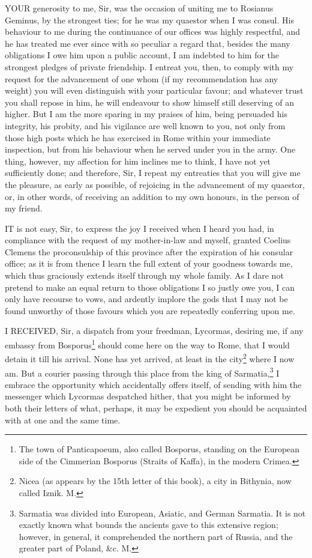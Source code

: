 YOUR generosity to me, Sir, was the occasion of uniting me to Rosianus
Geminus, by the strongest ties; for he was my quaestor when I was consul.
His behaviour to me during the continuance of our offices was highly
respectful, and he has treated me ever since with so peculiar a regard
that, besides the many obligations I owe him upon a public account, I am
indebted to him for the strongest pledges of private friendship. I entreat
you, then, to comply with my request for the advancement of one whom (if
my recommendation has any weight) you will even distinguish with your
particular favour; and whatever trust you shall repose in him, he will
endeavour to show himself still deserving of an higher. But I am the more
sparing in my praises of him, being persuaded his integrity, his probity,
and his vigilance are well known to you, not only from those high posts
which he has exercised in Rome within your immediate inspection, but from
his behaviour when he served under you in the army. One thing, however, my
affection for him inclines me to think, I have not yet sufficiently done;
and therefore, Sir, I repeat my entreaties that you will give me the
pleasure, as early as possible, of rejoicing in the advancement of my
quaestor, or, in other words, of receiving an addition to my own honours,
in the person of my friend.


IT is not easy, Sir, to express the joy I received when I heard you had,
in compliance with the request of my mother-in-law and myself, granted
Coelius Clemens the proconsulship of this province after the expiration of
his consular office; as it is from thence I learn the full extent of your
goodness towards me, which thus graciously extends itself through my whole
family. As I dare not pretend to make an equal return to those obligations
I so justly owe you, I can only have recourse to vows, and ardently
implore the gods that I may not be found unworthy of those favours which
you are repeatedly conferring upon me.


I RECEIVED, Sir, a dispatch from your freedman, Lycormas, desiring me, if
any embassy from Bosporus\footnote{The town of
Panticapoeum, also called Bosporus, standing on the European side of the
Cimmerian Bosporus (Straits of Kaffa), in the modern Crimea.} should come here on the way to Rome, that
I would detain it till his arrival. None has yet arrived, at least in the
city\footnote{Nicea (as appears by
the 15th letter of this book), a city in Bithynia, now called Iznik. M.}
where I now am. But a courier passing through this place from the king of
Sarmatia,\footnote{Sarmatia was divided
into European, Asiatic, and German Sarmatia. It is not exactly known what
bounds the ancients gave to this extensive region; however, in general, it
comprehended the northern part of Russia, and the greater part of Poland,
\&c. M.} I embrace the opportunity which
accidentally offers itself, of sending with him the messenger which
Lycormas despatched hither, that you might be informed by both their
letters of what, perhaps, it may be expedient you should be acquainted
with at one and the same time.

